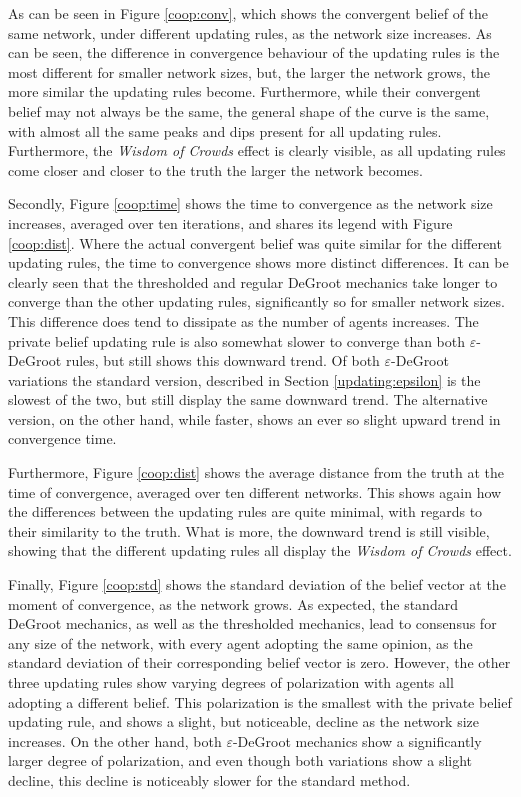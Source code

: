 \documentclass[a4paper, 12pt]{report}
\begin{document}
As can be seen in Figure \ref{coop:conv}, which shows the convergent belief of the same network, under different updating rules, as the network size increases. As can be seen, the difference in convergence behaviour of the updating rules is the most different for smaller network sizes, but, the larger the network grows, the more similar the updating rules become. Furthermore, while their convergent belief may not always be the same, the general shape of the curve is the same, with almost all the same peaks and dips present for all updating rules. Furthermore, the \emph{Wisdom of Crowds} effect is clearly visible, as all updating rules come closer and closer to the truth the larger the network becomes.

Secondly, Figure \ref{coop:time} shows the time to convergence as the network size increases, averaged over ten iterations, and shares its legend with Figure \ref{coop:dist}. Where the actual convergent belief was quite similar for the different updating rules, the time to convergence shows more distinct differences. It can be clearly seen that the thresholded and regular DeGroot mechanics take longer to converge than the other updating rules, significantly so for smaller network sizes. This difference does tend to dissipate as the number of agents increases. The private belief updating rule is also somewhat slower to converge than both $\varepsilon$-DeGroot rules, but still shows this downward trend. Of both $\varepsilon$-DeGroot variations the standard version, described in Section \ref{updating:epsilon} is the slowest of the two, but still display the same downward trend. The alternative version, on the other hand, while faster, shows an ever so slight upward trend in convergence time.

Furthermore, Figure \ref{coop:dist} shows the average distance from the truth at the time of convergence, averaged over ten different networks. This shows again how the differences between the updating rules are quite minimal, with regards to their similarity to the truth. What is more, the downward trend is still visible, showing that the different updating rules all display the \emph{Wisdom of Crowds} effect.

Finally, Figure \ref{coop:std} shows the standard deviation of the belief vector at the moment of convergence, as the network grows. As expected, the standard DeGroot mechanics, as well as the thresholded mechanics, lead to consensus for any size of the network, with every agent adopting the same opinion, as the standard deviation of their corresponding belief vector is zero. However, the other three updating rules show varying degrees of polarization with agents all adopting a different belief. This polarization is the smallest with the private belief updating rule, and shows a slight, but noticeable, decline as the network size increases. On the other hand, both $\varepsilon$-DeGroot mechanics show a significantly larger degree of polarization, and even though both variations show a slight decline, this decline is noticeably slower for the standard method.
\end{document}
